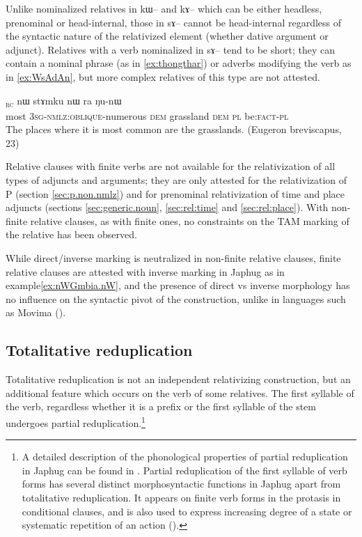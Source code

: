 \documentclass[oldfontcommands,oneside,a4paper,11pt]{article}
\newcommand{\ipa}[1]{{\phon #1}} %
\newcommand{\topic}{\textsc{dem}}
\newcommand{\rc}{\textsubscript{\textsc{rc}}}
\begin{document}
 
Unlike nominalized relatives in \ipa{kɯ}-- and \ipa{kɤ}-- which can be either headless, prenominal or head-internal, those in \ipa{sɤ}-- cannot be head-internal regardless of the syntactic nature of the relativized element (whether dative argument or adjunct). Relatives with a verb nominalized in \ipa{sɤ}-- tend to be short; they can contain a nominal phrase (as in  \ref{ex:thongthar}) or adverbs modifying the verb as in \ref{ex:WsAdAn}, but more complex relatives of this type are not attested.
 
\begin{exe}
   \ex \label{ex:WsAdAn}
 \gll  
  [\ipa{stu}   	\ipa{ɯ-sɤ-dɤn}]\rc{}   	\ipa{nɯ}   	\ipa{stɤmku}   	\ipa{nɯ} \ipa{ra}   	\ipa{ŋu-nɯ}   \\
most \textsc{3sg-nmlz:oblique}-numerous \topic{} grassland \topic{} \textsc{pl} be:\textsc{fact}-\textsc{pl} \\
\glt The places where it is most common are the grasslands. (Eugeron breviscapus, 23)
    \end{exe}
    

	  
	Relative clauses with finite verbs are not available for the relativization of all types of adjuncts and arguments; they are only attested for the relativization of P (section \ref{sec:p.non.nmlz}) and for prenominal relativization of time and place adjuncts (sections \ref{sec:generic.noun}, \ref{sec:rel:time} and \ref{sec:rel:place}). With non-finite relative clauses, as with finite ones, no constraints on the TAM marking of the relative has been observed. 
	
While direct/inverse marking is neutralized in non-finite relative clauses, finite relative clauses are attested with inverse marking in Japhug as in example\ref{ex:nWGmbia.nW}, and the presence of direct vs inverse morphology has no influence on the syntactic pivot of the construction, unlike in languages such as Movima (\citealt{haude09hierarchical}).

	
\subsection{Totalitative reduplication} \label{sec:redp}
Totalitative reduplication is not an independent relativizing construction, but an additional feature which occurs on the verb of some relatives. The first syllable of the verb, regardless whether it is a prefix or the first syllable of the stem undergoes partial reduplication.\footnote{A detailed description of the phonological properties of partial reduplication in Japhug   can be found in \citet{jacques04these, jacques07redupl}. Partial reduplication of the first syllable of   verb forms has several distinct morphosyntactic functions in Japhug apart from totalitative reduplication. It appears on  finite verb forms in the protasis in conditional clauses, and is also used to express increasing degree of a state or systematic repetition of an action (\citealt{jacques07redupl}).}
\end{document}
